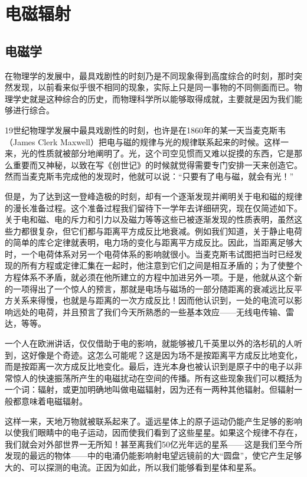 \chapter{电磁辐射}

\section{电磁学}

在物理学的发展中，最具戏剧性的时刻乃是不同现象得到高度综合的时刻，那时突然发现，以前看来似乎很不相同的现象，实际上只是同一事物的不同侧面而已。物理学史就是这种综合的历史，而物理科学所以能够取得成就，主要就是因为我们能够进行综合。

19世纪物理学发展中最具戏剧性的时刻，也许是在1860年的某一天当麦克斯韦（James Clerk Maxwell）把电与磁的规律与光的规律联系起来的时候。这样一来，光的性质就被部分地阐明了。光，这个司空见惯而又难以捉摸的东西，它是那么重要而又神秘，以致在写《创世记》的时候就觉得需要专门安排一天来创造它。然而当麦克斯韦完成他的发现时，他就可以说：“只要有了电与磁，就会有光！”

但是，为了达到这一登峰造极的时刻，却有一个逐渐发现并阐明关于电和磁的规律的漫长准备过程。这个准备过程我们留待下一学年去详细研究，现在仅简述如下。关于电和磁、电的斥力和引力以及磁力等等这些已被逐渐发现的性质表明，虽然这些力都很复杂，但它们都与距离平方成反比地衰减。例如我们知道，关于静止电荷的简单的库仑定律就表明，电力场的变化与距离平方成反比。因此，当距离足够大时，一个电荷体系对另一个电荷体系的影响就很小。当麦克斯韦试图把当时已经发现的所有方程或定律汇集在一起时，他注意到它们之间是相互矛盾的；为了使整个方程体系不矛盾，就必须在他所建立的方程中加进另外一项。于是，他就从这个新的一项得出了一个惊人的预言，那就是电场与磁场的一部分随距离的衰减远比反平方关系来得慢，也就是与距离的一次方成反比！因而他认识到，一处的电流可以影响远处的电荷，并且预言了我们今天所熟悉的一些基本效应——无线电传输、雷达，等等。

一个人在欧洲讲话，仅仅借助于电的影响，就能够被几千英里以外的洛杉矶的人听到，这好像是个奇迹。这怎么可能呢？这是因为场不是按距离平方成反比地变化，而是按距离一次方成反比地变化。最后，连光本身也被认识到是原子中的电子以非常惊人的快速振荡所产生的电磁扰动在空间的传播。所有这些现象我们可以概括为一个词：辐射，或更加明确地叫做电磁辐射，因为还有一两种其他辐射。但辐射一般都意味着电磁辐射。

这样一来，天地万物就被联系起来了。遥远星体上的原子运动仍能产生足够的影响以使我们眼睛中的电子运动，因而使我们看到了这些星星。如果这个规律不存在，我们就会对外部世界一无所知！甚至离我们50亿光年远的星系——这是我们至今所发现的最远的物体——中的电涌仍能影响射电望远镜前的大“圆盘”，使它产生足够大的、可以探测的电流。正因为如此，所以我们能够看到星体和星系。


